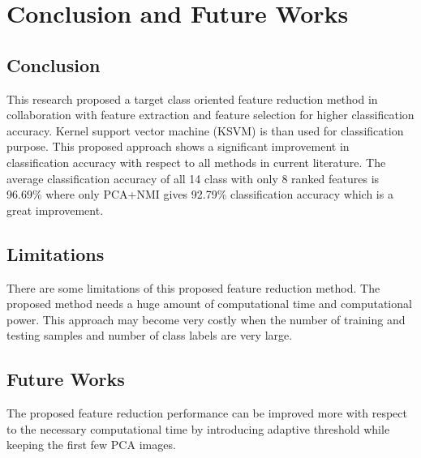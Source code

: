 \documentclass[document.tex]{subfiles}
\begin{document}
\chapter{Conclusion and Future Works}

\section{Conclusion}
\noindent This research proposed a target class oriented feature reduction method in collaboration with feature extraction and feature selection for higher classification accuracy. Kernel support vector machine (KSVM) is than used for classification purpose. This proposed approach shows a significant improvement in classification accuracy with respect to all methods in current literature. The average classification accuracy of all 14 class with only 8 ranked features is 96.69\% where only PCA+NMI gives 92.79\% classification accuracy which is a great improvement.
\section{Limitations}
\noindent There are some limitations of this proposed feature reduction method. The proposed method needs a huge amount of computational time and computational power. This approach may become very costly when the number of training and testing samples and number of class labels are very large.
\section{Future Works}
The proposed feature reduction performance can be improved more with respect to the necessary computational time by introducing adaptive threshold while keeping the first few PCA images.
\end{document}

